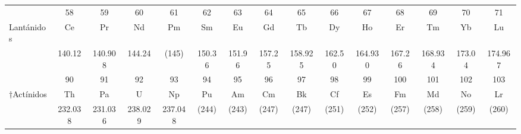 \begin{tcolorbox}[
        colback=colorrds!5!white,
        colframe=colorrds!35!white,
        coltitle=black,
        fonttitle=\bfseries,
        center title,
        title=Tabla Periódica de los Elementos]
\begin{center}
\begin{tabular}{|c*{16}{|c}|c|}
        \end{tabular}
    \end{center}
    \vspace{0.5cm}
    \hspace{-0.2cm}
    \begin{tabular}{|p{3.5cm}|*{14}{c|}}
        \hline
                               & \small 58      & \small 59      & \small 60      & \small 61      & \small 62     & \small 63     & \small 64     & \small 65      & \small 66     & \small 67      & \small 68     & \small 69      & \small 70     & \small 71      \\[-1mm]
        \sc *Lantánidos        & Ce             & Pr             & Nd             & Pm             & Sm            & Eu            & Gd            & Tb             & Dy            & Ho             & Er            & Tm             & Yb            & Lu             \\[-2mm]
                               & \small 140.12  & \small 140.908 & \small 144.24  & \small (145)   & \small 150.36 & \small 151.96 & \small 157.25 & \small 158.925 & \small 162.50 & \small 164.930 & \small 167.26 & \small 168.934 & \small 173.04 & \small 174.967 \\[-1mm]
        \hline
                               & \small 90      & \small 91      & \small 92      & \small 93      & \small 94     & \small 95     & \small 96     & \small 97      & \small 98     & \small 99      & \small 100    & \small 101     & \small 102    & \small 103     \\[-1mm]
        \sc $\dagger$Actínidos & Th             & Pa             & U              & Np             & Pu            & Am            & Cm            & Bk             & Cf            & Es             & Fm            & Md             & No            & Lr             \\[-2mm]
                               & \small 232.038 & \small 231.036 & \small 238.029 & \small 237.048 & \small (244)  & \small (243)  & \small (247)  & \small (247)   & \small (251)  & \small (252)   & \small (257)  & \small (258)   & \small (259)  & \small (260)   \\
        \hline
    \end{tabular}\end{tcolorbox}



